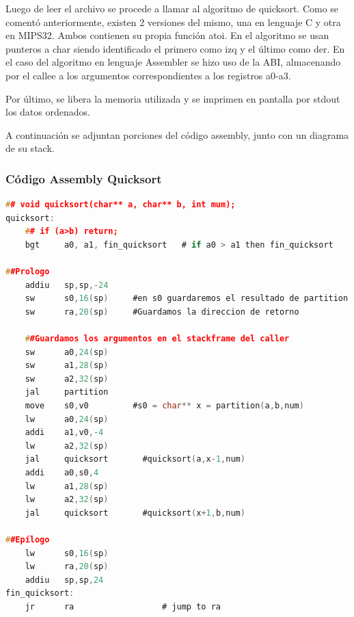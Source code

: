 \documentclass[a4paper,10pt]{article}
\numberwithin{equation}{section}
\numberwithin{figure}{section}
\begin{document}
Luego de leer el archivo se procede a llamar al algoritmo de quicksort. Como se comentó anteriormente, existen 2 versiones del mismo, una en lenguaje C y otra en MIPS32. Ambos contienen su propia función atoi. En el algoritmo se usan punteros a char siendo identificado el primero como izq y el último como der. En el caso del algoritmo en lenguaje Assembler se hizo uso de la ABI, almacenando por el callee a los argumentos correspondientes a los registros a0-a3.

Por último, se libera la memoria utilizada y se imprimen en pantalla por stdout los datos ordenados.


A continuación se adjuntan porciones del código assembly, junto con un diagrama de su stack.


\subsubsection{Código Assembly Quicksort}
\begin{lstlisting}[language=c, numbers=none]
## void quicksort(char** a, char** b, int mum);
quicksort:
    ## if (a>b) return;
    bgt		a0, a1, fin_quicksort	# if a0 > a1 then fin_quicksort  
    
##Prologo
    addiu   sp,sp,-24
    sw      s0,16(sp)     #en s0 guardaremos el resultado de partition
    sw      ra,20(sp)     #Guardamos la direccion de retorno

    ##Guardamos los argumentos en el stackframe del caller
    sw      a0,24(sp)
    sw      a1,28(sp)
    sw      a2,32(sp)
    jal     partition
    move    s0,v0         #s0 = char** x = partition(a,b,num)
    lw      a0,24(sp)     
    addi    a1,v0,-4
    lw      a2,32(sp)
    jal     quicksort       #quicksort(a,x-1,num)
    addi    a0,s0,4
    lw      a1,28(sp)
    lw      a2,32(sp)
    jal     quicksort       #quicksort(x+1,b,num)

##Epílogo
    lw      s0,16(sp)
    lw      ra,20(sp)
    addiu   sp,sp,24
fin_quicksort:
    jr		ra					# jump to ra

\end{lstlisting}
\end{document}
